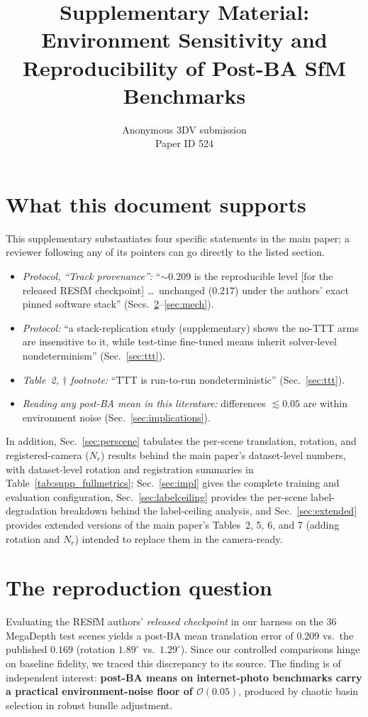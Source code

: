 \documentclass[10pt,twocolumn,letterpaper]{article}
\title{Supplementary Material:\\
Environment Sensitivity and Reproducibility of Post-BA SfM Benchmarks}
\author{Anonymous 3DV submission\\ Paper ID 524}
\renewcommand{\deg}{^{\circ}}
\begin{document}
\maketitle
\setcounter{table}{7}
\setcounter{figure}{4}

\section{What this document supports}
This supplementary substantiates four specific statements in the main paper; a reviewer
following any of its pointers can go directly to the listed section.
\begin{itemize}\itemsep2pt
\item \emph{Protocol, ``Track provenance'':} ``$\sim\!0.209$ is the reproducible level
[for the released RESfM checkpoint] \ldots\ unchanged ($0.217$) under the authors'
exact pinned software stack'' (Secs.~\ref{sec:repro}--\ref{sec:mech}).
\item \emph{Protocol:} ``a stack-replication study (supplementary) shows the no-TTT arms
are insensitive to it, while test-time fine-tuned means inherit solver-level
nondeterminism'' (Sec.~\ref{sec:ttt}).
\item \emph{Table~2, $\dagger$ footnote:} ``TTT is run-to-run nondeterministic''
(Sec.~\ref{sec:ttt}).
\item \emph{Reading any post-BA mean in this literature:} differences
$\lesssim\!0.05$ are within environment noise (Sec.~\ref{sec:implications}).
\end{itemize}
In addition, Sec.~\ref{sec:perscene} tabulates the per-scene translation, rotation, and
registered-camera ($N_r$) results behind the main paper's dataset-level numbers, with
dataset-level rotation and registration summaries in Table~\ref{tab:supp_fullmetrics};
Sec.~\ref{sec:impl} gives the complete training and
evaluation configuration, Sec.~\ref{sec:labelceiling} provides the per-scene
label-degradation breakdown behind the label-ceiling analysis, and
Sec.~\ref{sec:extended} provides extended versions of the main paper's Tables~2, 5, 6,
and 7 (adding rotation and $N_r$) intended to replace them in the camera-ready.

\section{The reproduction question}\label{sec:repro}
Evaluating the RESfM authors' \emph{released checkpoint} in our harness on the 36 MegaDepth
test scenes yields a post-BA mean translation error of $0.209$ vs.\ the published $0.169$
(rotation $1.89\deg$ vs.\ $1.29\deg$). Since our controlled comparisons hinge on baseline
fidelity, we traced this discrepancy to its source. The finding is of independent
interest: \textbf{post-BA means on internet-photo benchmarks carry a practical
environment-noise floor of $\mathcal{O}(0.05)$}, produced by chaotic basin selection in
robust bundle adjustment.
\end{document}
